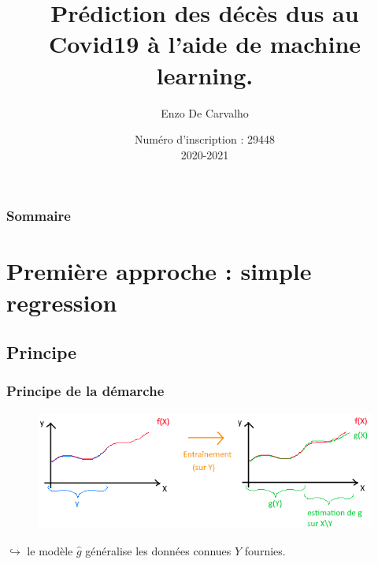 \documentclass{beamer}[aspectratio = 43]
\title{Prédiction des décès dus au Covid19 à l'aide de machine learning.}
\subtitle{}
\author{Enzo De Carvalho}
\date{
	Numéro d'inscription : 29448\\%
	\vspace{5pt}
	2020-2021\\%
	}
\begin{document}
\begin{frame}
	\maketitle
\end{frame}

\begin{frame}
	\frametitle{Sommaire}
	\tableofcontents
\end{frame}

\section{Première approche : simple regression}
\subsection*{Principe}
\begin{frame}
	\frametitle{Principe de la démarche}
	\begin{figure}[t]
		\centering
		\includegraphics[scale=0.7]{super_schema}
	\end{figure}
	$\hookrightarrow$ le modèle $\hat{g}$ généralise les données connues $Y$ fournies.
\end{frame}
\end{document}
